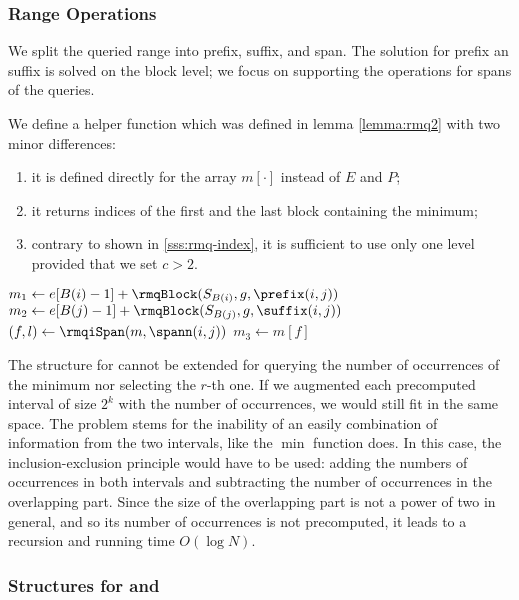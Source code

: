 \subsubsection{Range Operations}

We split the queried range into prefix, suffix, and span.
The solution for prefix an suffix is solved on the block level; we focus on supporting the operations for spans of the queries.

We define a helper function \rmqiSpan{} which was defined in lemma \ref{lemma:rmq2} with two minor differences:
\begin{enumerate}
	\item it is defined directly for the array $m[\cdot]$ instead of $E$ and $P$;
	\item it returns indices of the first and the last block containing the minimum;
	\item contrary to \rmqi{} shown in \ref{sss:rmq-index}, it is sufficient to use only one level provided that we set $c > 2$.
\end{enumerate}

\begin{algorithmic}
	\State $m_1 \gets e[B(i) - 1] + \rmqBlock(S_{B(i)}, g, \prefix(i, j))$
	\State $m_2 \gets e[B(j) - 1] + \rmqBlock(S_{B(j)}, g, \suffix(i, j))$
	\State $(f, l) \gets \rmqiSpan(m, \spann(i, j))$
	\State $m_3 \gets m[f]$
	\State {}
\EndFunction
\end{algorithmic}

The structure for \rmqiSpan{} cannot be extended for querying the number of occurrences of the minimum nor selecting the $r$-th one.
If we augmented each precomputed interval of size $2^k$ with the number of occurrences, we would still fit in the same space.
The problem stems for the inability of an easily combination of information from the two intervals, like the $\min$ function does.
In this case, the inclusion-exclusion principle would have to be used: adding the numbers of occurrences in both intervals and subtracting the number of occurrences in the overlapping part.
Since the size of the overlapping part is not a power of two in general, and so its number of occurrences is not precomputed, it leads to a recursion and running time $O(\log N)$.

\subsubsection{Structures for \rmqSize{} and \rmqSelect{}}

